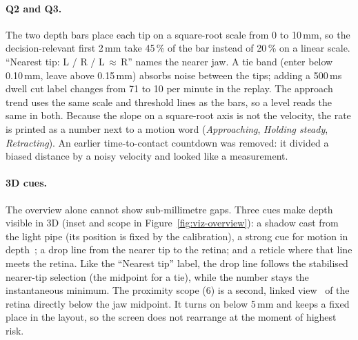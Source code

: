 \paragraph{Q2 and Q3.} The two depth bars place each tip on a square-root scale
from 0 to 10\,mm, so the decision-relevant first 2\,mm take 45\,\% of the bar
instead of 20\,\% on a linear scale. ``Nearest tip: L / R / L\,$\approx$\,R'' names
the nearer jaw. A tie band (enter below 0.10\,mm, leave above 0.15\,mm)
absorbs noise between the tips; adding a 500\,ms dwell cut label changes from 71
to 10 per minute in the replay. The approach trend uses the same
scale and threshold lines as the bars, so a level reads the same in both. Because
the slope on a square-root axis is not the velocity, the rate is printed as a
number next to a motion word (\emph{Approaching}, \emph{Holding steady},
\emph{Retracting}). An earlier time-to-contact countdown was removed: it divided a
biased distance by a noisy velocity and looked like a measurement.

\paragraph{3D cues.} The overview alone cannot show sub-millimetre gaps. Three cues
make depth visible in 3D (inset and scope in Figure~\ref{fig:viz-overview}): a shadow cast
from the light pipe (its position is fixed by the calibration), a strong cue for
motion in depth~\cite{kersten1997}; a drop line from the nearer tip to the
retina; and a reticle where that line meets the retina. Like the ``Nearest tip''
label, the drop line follows the stabilised nearer-tip selection (the midpoint
for a tie), while the number stays the instantaneous minimum. The proximity
scope (6) is a second, linked view~\cite{roberts2007} of the retina directly
below the jaw midpoint. It turns on below 5\,mm and keeps a fixed place in the layout, so
the screen does not rearrange at the moment of highest risk.

